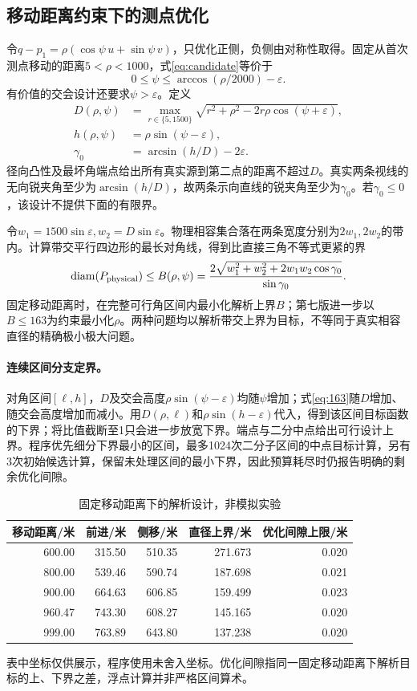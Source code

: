 \documentclass[UTF8,a4paper,zihao=-4,fontset=windows]{ctexart}
\begin{document}
\subsection{移动距离约束下的测点优化}
令$q-p_1=\rho(\cos\psi\,u+\sin\psi\,v)$，只优化正侧，负侧由对称性取得。固定从首次测点移动的距离$5<\rho<1000$，式\eqref{eq:candidate}等价于
\begin{equation}
0\le\psi\le\arccos(\rho/2000)-\varepsilon.
\end{equation}
有价值的交会设计还要求$\psi>\varepsilon$。定义
\begin{align}
D(\rho,\psi)&=\max_{r\in\{5,1500\}}
\sqrt{r^2+\rho^2-2r\rho\cos(\psi+\varepsilon)},\\
h(\rho,\psi)&=\rho\sin(\psi-\varepsilon),\\
\gamma_0&=\arcsin(h/D)-2\varepsilon.
\end{align}
径向凸性及最坏角端点给出所有真实源到第二点的距离不超过$D$。真实两条视线的无向锐夹角至少为$\arcsin(h/D)$，故两条示向直线的锐夹角至少为$\gamma_0$。若$\gamma_0\le0$，该设计不提供下面的有限界。

令$w_1=1500\sin\varepsilon,w_2=D\sin\varepsilon$。物理相容集合落在两条宽度分别为$2w_1,2w_2$的带内。计算带交平行四边形的最长对角线，得到比直接三角不等式更紧的界
\begin{equation}\label{eq:163}
\operatorname{diam}(P_{\rm physical})\le
B(\rho,\psi)=
\frac{2\sqrt{w_1^2+w_2^2+2w_1w_2\cos\gamma_0}}{\sin\gamma_0}.
\end{equation}
固定移动距离时，在完整可行角区间内最小化解析上界$B$；第七版进一步以$B\le163$为约束最小化$\rho$。两种问题均以解析带交上界为目标，不等同于真实相容直径的精确极小极大问题。

\paragraph{连续区间分支定界。}
对角区间$[\ell,h]$，$D$及交会高度$\rho\sin(\psi-\varepsilon)$均随$\psi$增加；式\eqref{eq:163}随$D$增加、随交会高度增加而减小。用$D(\rho,\ell)$和$\rho\sin(h-\varepsilon)$代入，得到该区间目标函数的下界；将比值截断至1只会进一步放宽下界。端点与二分中点给出可行设计上界。程序优先细分下界最小的区间，最多1024次二分子区间的中点目标计算，另有3次初始候选计算，保留未处理区间的最小下界，因此预算耗尽时仍报告明确的剩余优化间隙。

\begin{table}[htbp]\centering\small
\caption{固定移动距离下的解析设计，非模拟实验}
\begin{tabular}{rrrrr}\toprule
移动距离/米&前进/米&侧移/米&直径上界/米&优化间隙上限/米\\\midrule
600.00&315.50&510.35&271.673&0.020\\
800.00&539.46&590.74&187.698&0.021\\
900.00&664.63&606.85&159.499&0.023\\
960.47&743.30&608.27&145.165&0.020\\
999.00&763.89&643.80&137.238&0.020\\\bottomrule
\end{tabular}
\end{table}
表中坐标仅供展示，程序使用未舍入坐标。优化间隙指同一固定移动距离下解析目标的上、下界之差，浮点计算并非严格区间算术。
\end{document}
